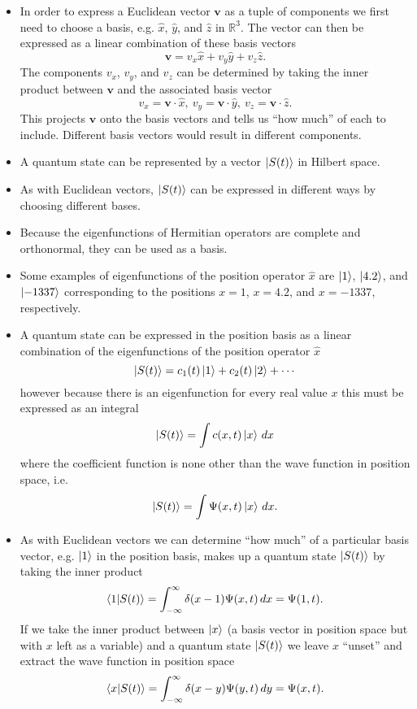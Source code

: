 \documentclass{article}
\renewcommand{\vec}[1]{\boldsymbol{\mathbf{#1}}}
\begin{document}
\begin{itemize}
  \item In order to express a Euclidean vector $\vec{v}$ as a tuple of components we first need to choose a basis, e.g. $\hat{x}$, $\hat{y}$, and $\hat{z}$ in $\mathbb{R}^3$. The vector can then be expressed as a linear combination of these basis vectors \[\vec{v} = v_x \hat{x} + v_y \hat{y} + v_z \hat{z}.\] The components $v_x$, $v_y$, and $v_z$ can be determined by taking the inner product between $\vec{v}$ and the associated basis vector \[v_x = \vec{v} \cdot \hat{x}, \ v_y = \vec{v} \cdot \hat{y}, \ v_z = \vec{v} \cdot \hat{z}.\] This projects $\vec{v}$ onto the basis vectors and tells us ``how much'' of each to include. Different basis vectors would result in different components.

  \item A quantum state can be represented by a vector $\ket{S(t)}$ in Hilbert space.

  \item As with Euclidean vectors, $\ket{S(t)}$ can be expressed in different ways by choosing different bases.

  \item Because the eigenfunctions of Hermitian operators are complete and orthonormal, they can be used as a basis.

  \item Some examples of eigenfunctions of the position operator $\hat{x}$ are $\ket{1}$, $\ket{4.2}$, and $\ket{-1337}$ corresponding to the positions $x = 1$, $x = 4.2$, and $x = -1337$, respectively.

  \item A quantum state can be expressed in the position basis as a linear combination of the eigenfunctions of the position operator $\hat{x}$ \[\ket{S(t)} = c_1(t) \ket{1} + c_2(t) \ket{2} + \cdots\] however because there is an eigenfunction for every real value $x$ this must be expressed as an integral \[\ket{S(t)} = \int c(x, t) \ket{x} \,d x\] where the coefficient function is none other than the wave function in position space, i.e. \[\ket{S(t)} = \int \Psi(x, t) \ket{x} \,d x.\]

  \item As with Euclidean vectors we can determine ``how much'' of a particular basis vector, e.g. $\ket{1}$ in the position basis, makes up a quantum state $\ket{S(t)}$ by taking the inner product \[\braket{1 | S(t)} = \int_{-\infty}^\infty \delta(x - 1) \Psi(x, t) \,d x = \Psi(1, t).\] If we take the inner product between $\ket{x}$ (a basis vector in position space but with $x$ left as a variable) and a quantum state $\ket{S(t)}$ we leave $x$ ``unset'' and extract the wave function in position space \[\braket{x | S(t)} = \int_{-\infty}^\infty \delta(x - y) \Psi(y, t) \,d y = \Psi(x, t).\]


\end{itemize}
\end{document}
